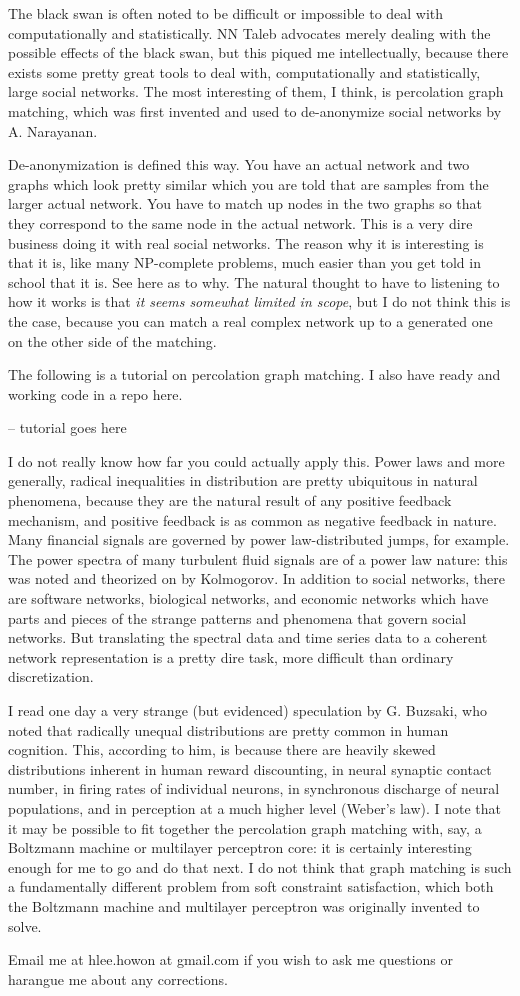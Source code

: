 \documentclass[12pt]{article}
\begin{document}
The black swan is often noted to be difficult or impossible to deal with computationally and statistically. NN Taleb advocates merely dealing with the possible effects of the black swan, but this piqued me intellectually, because there exists some pretty great tools to deal with, computationally and statistically, large social networks. The most interesting of them, I think, is percolation graph matching, which was first invented and used to de-anonymize social networks by A. Narayanan.

De-anonymization is defined this way. You have an actual network and two graphs which look pretty similar which you are told that are samples from the larger actual network. You have to match up nodes in the two graphs so that they correspond to the same node in the actual network. This is a very dire business doing it with real social networks. The reason why it is interesting is that it is, like many NP-complete problems, much easier than you get told in school that it is. See here as to why. The natural thought to have to listening to how it works is that \emph{it seems somewhat limited in scope}, but I do not think this is the case, because you can match a real complex network up to a generated one on the other side of the matching.

The following is a tutorial on percolation graph matching. I also have ready and working code in a repo here.

-- tutorial goes here

I do not really know how far you could actually apply this. Power laws and more generally, radical inequalities in distribution are pretty ubiquitous in natural phenomena, because they are the natural result of any positive feedback mechanism, and positive feedback is as common as negative feedback in nature. Many financial signals are governed by power law-distributed jumps, for example. The power spectra of many turbulent fluid signals are of a power law nature: this was noted and theorized on by Kolmogorov. In addition to social networks, there are software networks, biological networks, and economic networks which have parts and pieces of the strange patterns and phenomena that govern social networks. But translating the spectral data and time series data to a coherent network representation is a pretty dire task, more difficult than ordinary discretization.

I read one day a very strange (but evidenced) speculation by G. Buzsaki, who noted that radically unequal distributions are pretty common in human cognition. This, according to him, is because there are heavily skewed distributions inherent in human reward discounting, in neural synaptic contact number, in firing rates of individual neurons, in synchronous discharge of neural populations, and in perception at a much higher level (Weber's law). I note that it may be possible to fit together the percolation graph matching with, say, a Boltzmann machine or multilayer perceptron core: it is certainly interesting enough for me to go and do that next. I do not think that graph matching is such a fundamentally different problem from soft constraint satisfaction, which both the Boltzmann machine and multilayer perceptron was originally invented to solve.

Email me at hlee.howon at gmail.com if you wish to ask me questions or harangue me about any corrections.
\end{document}
